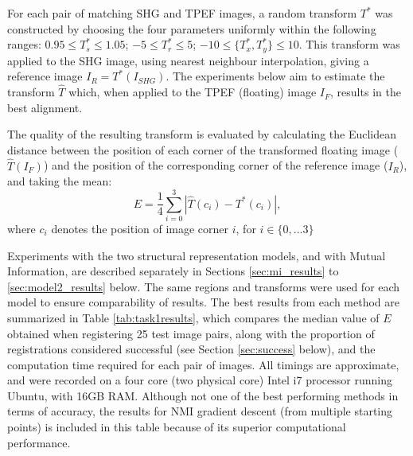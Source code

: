 \documentclass{report}
\begin{document}
For each pair of matching SHG and TPEF images, a random transform $T^*$ was constructed by choosing the four parameters uniformly within the following ranges: $0.95\leq T^*_s\leq 1.05$; $-5\leq T^*_r\leq 5$; $-10\leq \{T^*_x, T^*_y\}\leq 10$. This transform was applied to the SHG image, using nearest neighbour interpolation, giving a reference image $I_R = T^*(I_{SHG})$. The experiments below aim to estimate the transform $\hat{T}$ which, when applied to the TPEF (floating) image $I_F$, results in the best alignment.

The quality of the resulting transform is evaluated by calculating the Euclidean distance between the position of each corner of the transformed floating image ($\hat{T}(I_F)$) and the position of the corresponding corner of the reference image ($I_R$), and taking the mean:
\begin{equation}
E = \frac{1}{4} \sum_{i=0}^{3} | \hat{T}(c_i) - T^*(c_i) |,
\label{eq:E}
\end{equation}
where $c_i$ denotes the position of image corner $i$, for $i \in \{0,...3\}$

Experiments with the two structural representation models, and with Mutual Information, are described separately in Sections \ref{sec:mi_results} to \ref{sec:model2_results} below. The same regions and transforms were used for each model to ensure comparability of results. The best results from each method are summarized in Table \ref{tab:task1results}, which compares the median value of $E$ obtained when registering 25 test image pairs, along with the proportion of registrations considered successful (see Section \ref{sec:success} below), and the computation time required for each pair of images. All timings are approximate, and were recorded on a four core (two physical core) Intel i7 processor running Ubuntu, with 16GB RAM. Although not one of the best performing methods in terms of accuracy, the results for NMI gradient descent (from multiple starting points) is included in this table because of its superior computational performance.
\end{document}
